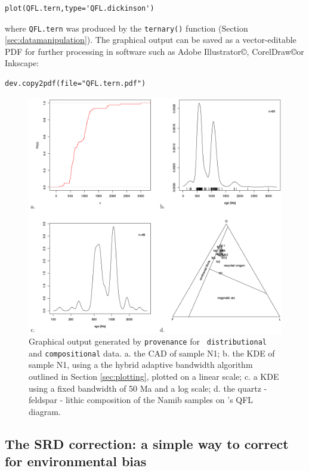 \documentclass{article}
\begin{document}
\begin{verbatim}
plot(QFL.tern,type='QFL.dickinson')
\end{verbatim}

where {\tt QFL.tern} was produced by the {\tt ternary()} function
(Section \ref{sec:datamanipulation}). The graphical output can be
saved as a vector-editable PDF for further processing in software such
as Adobe Illustrator\copyright, CorelDraw\copyright or
Inkscape:

\begin{verbatim}
dev.copy2pdf(file="QFL.tern.pdf")
\end{verbatim}

\begin{figure}
\centering
\includegraphics[width=\textwidth]{visualisation.png}
\caption{Graphical output generated by {\tt provenance} for {\tt
    distributional} and {\tt compositional} data.  a. the CAD of
  sample N1; b. the KDE of sample N1, using a the hybrid adaptive
  bandwidth algorithm outlined in Section \ref{sec:plotting}, plotted
  on a linear scale; c. a KDE using a fixed bandwidth of 50 Ma and a
  log scale; d. the quartz - feldspar - lithic composition of the
  Namib samples on \citet{dickinson1983}'s QFL diagram.}
\label{fig:visualisation}
\end{figure}

\subsection{The SRD correction: a simple way to correct 
for environmental bias}
\label{sec:srd}
\end{document}
